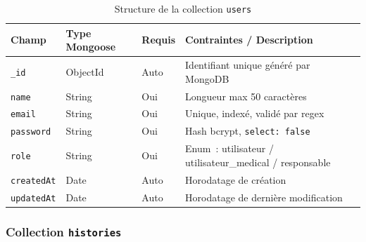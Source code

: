 \begin{table}[H]
\centering
\caption{Structure de la collection \texttt{users}}
\label{tab:collection_users}
\begin{tabularx}{\textwidth}{p{3cm} p{2.5cm} p{2cm} X}
\toprule
\textbf{Champ} & \textbf{Type Mongoose} & \textbf{Requis} & \textbf{Contraintes / Description} \\
\midrule
\texttt{\_id}       & ObjectId   & Auto & Identifiant unique généré par MongoDB \\
\texttt{name}       & String     & Oui  & Longueur max 50 caractères \\
\texttt{email}      & String     & Oui  & Unique, indexé, validé par regex \\
\texttt{password}   & String     & Oui  & Hash bcrypt, \texttt{select: false} \\
\texttt{role}       & String     & Oui  & Enum~: utilisateur / utilisateur\_medical / responsable \\
\texttt{createdAt}  & Date       & Auto & Horodatage de création \\
\texttt{updatedAt}  & Date       & Auto & Horodatage de dernière modification \\
\bottomrule
\end{tabularx}
\end{table}

\subsubsection{Collection \texttt{histories}}

